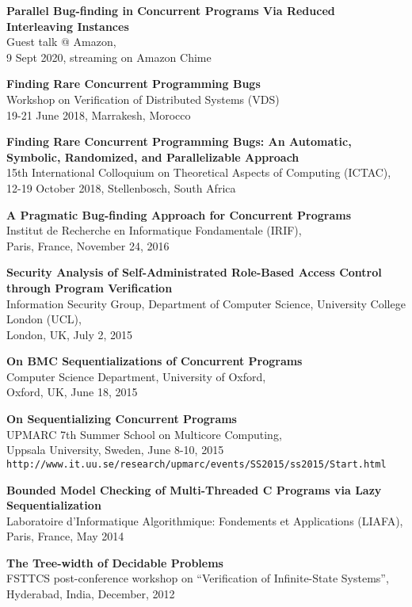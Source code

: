 \begin{resume}
{\bf Parallel Bug-finding in Concurrent Programs Via Reduced Interleaving Instances}\\
Guest talk @ Amazon,\\
9 Sept 2020, streaming on Amazon Chime


{\bf Finding Rare Concurrent Programming Bugs}\\
Workshop on Verification of Distributed Systems (VDS)\\
19-21 June 2018, Marrakesh, Morocco


{\bf Finding Rare Concurrent Programming Bugs:
An Automatic, Symbolic, Randomized, and Parallelizable Approach}\\
15th International Colloquium on Theoretical Aspects of Computing (ICTAC),\\
12-19 October 2018, Stellenbosch, South Africa


{\bf A Pragmatic Bug-finding Approach for Concurrent Programs}\\
Institut de Recherche en Informatique Fondamentale (IRIF),\\
Paris, France, November 24, 2016


{\bf Security Analysis of Self-Administrated Role-Based Access Control through Program Verification}\\
Information Security Group, Department of Computer Science, University College London (UCL),\\
London, UK, July 2, 2015


{\bf On BMC Sequentializations of Concurrent Programs}\\
Computer Science Department, University of Oxford,\\
Oxford, UK, June 18, 2015

{\bf On Sequentializing Concurrent Programs}\\
UPMARC 7th Summer School on Multicore Computing,   \\
Uppsala University, Sweden, June 8-10, 2015 \\
{\tt http://www.it.uu.se/research/upmarc/events/SS2015/ss2015/Start.html}


{\bf Bounded Model Checking of Multi-Threaded C Programs via Lazy Sequentialization}\\
Laboratoire d'Informatique Algorithmique: Fondements et Applications  (LIAFA), \\
Paris, France, May 2014


{\bf The Tree-width of Decidable Problems}\\
FSTTCS post-conference workshop on ``Verification of Infinite-State Systems'',
Hyderabad, India, December, 2012 


\end{resume}

